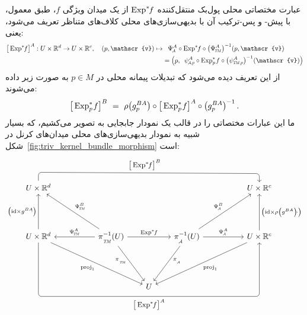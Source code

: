 عبارت مختصاتی محلی پول‌بک منتقل‌کننده $\operatorname{Exp}^*\mkern-5mu f$ از یک میدان ویژگی $f$، طبق معمول، با پیش- و پس-ترکیب آن با بدیهی‌سازی‌های محلی کلاف‌های متناظر تعریف می‌شود، یعنی:
\begin{align}\label{eq:kft_coordinate_expression_62}
    \big[\Expsf \big]^A: U\times \R^d \to U\times \R^c,\ \ \ 
    (p,\mathscr{v}) \mapsto&\phantom{=} \PsiA^A \circ \Expsf \circ \big(\PsiTM^A \big)^{-1} (p, \mathscr{v}) \notag \\
                             &= \pig(p,\,\ \psiAp^A \circ \Expspf \circ \big(\psiTMp^A \big)^{-1} (\mathscr{v}) \pig)
\end{align}
از این تعریف دیده می‌شود که تبدیلات پیمانه محلی در $p\in M$ به صورت زیر داده می‌شوند:
\begin{align}
    \big[\operatorname{Exp}^*_p\mkern-2mu f \big]^B \ =\ \rho\big( g_p^{BA}\big) \circ \big[\operatorname{Exp}^*_p\mkern-2mu f \big]^A \circ \big(g_p^{BA}\big)^{-1} \,.
\end{align}
ما این عبارات مختصاتی را در قالب یک نمودار جابجایی به تصویر می‌کشیم، که بسیار شبیه به نمودار بدیهی‌سازی‌های محلی میدان‌های کرنل در شکل~\ref{fig:triv_kernel_bundle_morphism} است:
\begin{equation}
\begin{tikzcd}[row sep=4.5em, column sep=5.2em]
      U\times\R^d
                        \arrow[rrrr, pos=.48, rounded corners, to path={ 
                                -- ([yshift=2.5ex]\tikztostart.north) 
                                --node[above]{\small$
                                    \big[\Expsf \big]^B
                                $} ([yshift=2.5ex]\tikztotarget.north) 
                                -- (\tikztotarget.north)
                                }]
    & &[-3.25em] &[-3.25em] &
    U\times\R^c
    \\
    U\times\R^d
                        \arrow[u, "\big(\id\times g^{BA}\!\!\cdot\big)"]
                        \arrow[rrd, "\proj_1"']
                        \arrow[rrrr, pos=.5, rounded corners, to path={ 
                                -- ([yshift=-16.ex]\tikztostart.south) 
                                --node[below]{\small$
                                    \big[\Expsf \big]^A
                                $} ([yshift=-16.ex]\tikztotarget.south) 
                                -- (\tikztotarget.south)
                                }]
    &
    \piTM^{-1}(U)   
                        \arrow[rd, "\piTM\!\!"', pos=0.3]
                        \arrow[rr, "\Expsf"]
                        \arrow[lu, "\PsiTM^B"']
                        \arrow[l,  "\PsiTM^A"']
    & &
    \piA^{-1}(U)
                        \arrow[ld, "\!\piA", pos=0.3]
                        \arrow[r,  "\PsiA^A"]
                        \arrow[ru, "\PsiA^B"]
    &
    U\times\R^c
                        \arrow[u, "\big(\id\times \rho\big(g^{BA}\big)\!\cdot\big)"']
    \arrow[lld, "\proj_1"] \\
    & &
    U
    & &
\end{tikzcd}
\end{equation}

